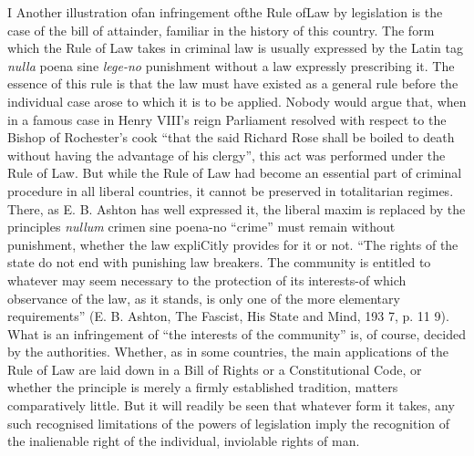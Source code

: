 \documentclass[11pt,openany]{book}
\begin{document}
\begin{center}\textasteriskcentered\hspace{0.9em}\textasteriskcentered\hspace{0.9em}\textasteriskcentered\end{center}

\begin{center}\textasteriskcentered\hspace{0.9em}\textasteriskcentered\hspace{0.9em}\textasteriskcentered\end{center}

I Another illustration ofan infringement ofthe Rule ofLaw by legislation is the case of the bill of attainder, familiar in the history of this country. The form which the Rule of Law takes in criminal law is usually expressed by the Latin tag \emph{nulla} poena sine \emph{lege-no} punishment without a law expressly prescribing it. The essence of this rule is that the law must have existed as a general rule before the individual case arose to which it is to be applied. Nobody would argue that, when in a famous case in Henry VIII's reign Parliament resolved with respect to the Bishop of Rochester's cook ``that the said Richard Rose shall be boiled to death without having the advantage of his clergy'', this act was performed under the Rule of Law. But while the Rule of Law had become an essential part of criminal procedure in all liberal countries, it cannot be preserved in totalitarian regimes. There, as E. B. Ashton has well expressed it, the liberal maxim is replaced by the principles \emph{nullum} crimen sine poena-no ``crime'' must remain without punishment, whether the law expliCitly provides for it or not. ``The rights of the state do not end with punishing law breakers. The community is entitled to whatever may seem necessary to the protection of its interests-of which observance of the law, as it stands, is only one of the more elementary requirements'' (E. B. Ashton, The Fascist, His State and Mind, 193 7, p. 11 9). What is an infringement of ``the interests of the community'' is, of course, decided by the authorities. Whether, as in some countries, the main applications of the Rule of Law are laid down in a Bill of Rights or a Constitutional Code, or whether the principle is merely a firmly established tradition, matters comparatively little. But it will readily be seen that whatever form it takes, any such recognised limitations of the powers of legislation imply the recognition of the inalienable right of the individual, inviolable rights of man.
\end{document}

